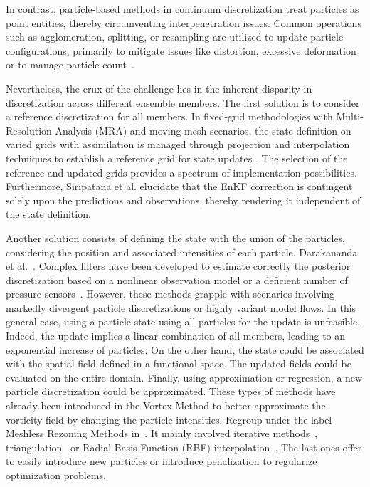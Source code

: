 In contrast, particle-based methods in continuum discretization treat particles as point entities, thereby circumventing interpenetration issues. Common operations such as agglomeration, splitting, or resampling are utilized to update particle configurations, primarily to mitigate issues like distortion, excessive deformation or to manage particle count~\cite{yue_continuum_2015,cottet_multi-purpose_1999}.

Nevertheless, the crux of the challenge lies in the inherent disparity in discretization across different ensemble members.
The first solution is to consider a reference discretization for all members.
In fixed-grid methodologies with Multi-Resolution Analysis (MRA) and moving mesh scenarios, the state definition on varied grids with assimilation is managed through projection and interpolation techniques to establish a reference grid for state updates \cite{siripatana_combining_2019,bonan_data_2017}. The selection of the reference and updated grids provides a spectrum of implementation possibilities. Furthermore, Siripatana et al. \cite{siripatana_combining_2019} elucidate that the EnKF correction is contingent solely upon the predictions and observations, thereby rendering it independent of the state definition.

Another solution consists of defining the state with the union of the particles, considering the position and associated intensities of each particle. Darakananda et al.~\cite{darakananda_data-assimilated_2018}. Complex filters have been developed to estimate correctly the posterior discretization based on a nonlinear observation model or a deficient number of pressure sensors~\cite{le_provost_low-rank_2021}.
However, these methods grapple with scenarios involving markedly divergent particle discretizations or highly variant model flows. In this general case, using a particle state using all particles for the update is unfeasible. Indeed, the update implies a linear combination of all members, leading to an exponential increase of particles.
On the other hand, the state could be associated with the spatial field defined in a functional space. The updated fields could be evaluated on the entire domain. Finally, using approximation or regression, a new particle discretization could be approximated. These types of methods have already been introduced in the Vortex Method to better approximate the vorticity field by changing the particle intensities. Regroup under the label Meshless Rezoning Methods in~\cite{mimeau_review_2021}. It mainly involved iterative methods~\cite{beale_1988},  triangulation~\cite{russo_1994} or Radial Basis Function (RBF) interpolation~\cite{barba_lorena_a_vortex_2004,sperotto_2021}. The last ones offer to easily introduce new particles or introduce penalization to regularize optimization problems.\newline

